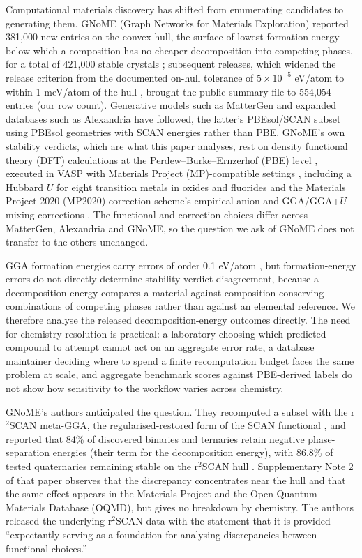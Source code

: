 \documentclass[11pt]{article}
\begin{document}
Computational materials discovery has shifted from enumerating candidates to generating
them. GNoME (Graph Networks for Materials Exploration) reported 381{,}000 new entries on the
convex hull, the surface of lowest formation energy below which a composition has no
cheaper decomposition into competing phases, for a total of 421{,}000
stable crystals \citep{merchant2023}; subsequent releases, which widened the
release criterion from the documented on-hull tolerance of $5\times10^{-5}$ eV/atom to
within 1 meV/atom of the hull \citep{gnomedataset}, brought the public summary file to
554{,}054 entries (our row count). Generative models such as MatterGen
\citep{zeni2025} and expanded databases such as Alexandria have followed, the latter's
PBEsol/SCAN subset \citep{schmidt2022} using PBEsol geometries with SCAN energies
rather than PBE. GNoME's own stability verdicts, which are
what this paper analyses, rest on density functional theory (DFT) calculations at the
Perdew--Burke--Ernzerhof (PBE) level \citep{pbe1996}, executed in VASP \citep{vasp1996}
with Materials Project (MP)-compatible settings \citep{jain2013}, including a Hubbard $U$
for eight transition metals in oxides and fluorides and the Materials Project 2020 (MP2020) correction scheme's empirical anion and
GGA/GGA+$U$ mixing corrections \citep{wang2021mp2020}. The functional and
correction choices differ across MatterGen, Alexandria and GNoME, so the question we ask
of GNoME does not transfer to the others unchanged.

GGA formation energies carry errors of order 0.1 eV/atom \citep{kirklin2015}, but
formation-energy errors do not directly determine stability-verdict disagreement,
because a decomposition energy compares a material against composition-conserving
combinations of competing phases rather than against an elemental reference. We
therefore analyse the released decomposition-energy outcomes directly. The need for
chemistry resolution is practical: a laboratory choosing which predicted compound to attempt cannot act on
an aggregate error rate, a database maintainer deciding where to spend a finite
recomputation budget faces the same problem at scale, and aggregate benchmark scores
against PBE-derived labels \citep{riebesell2025} do not show how sensitivity to the
workflow varies across chemistry.

GNoME's authors anticipated the question. They recomputed a subset with the r$^2$SCAN
meta-GGA, the regularised-restored form of the SCAN functional \citep{furness2020}, and reported that 84\% of discovered binaries and ternaries
retain negative phase-separation energies (their term for the decomposition energy), with
86.8\% of tested quaternaries remaining
stable on the r$^2$SCAN hull \citep{merchant2023}. Supplementary Note 2 of that paper observes that the
discrepancy concentrates near the hull and that the same effect appears in the Materials
Project and the Open Quantum Materials Database (OQMD), but gives no breakdown by chemistry. The authors released the underlying
r$^2$SCAN data with the statement that it is provided ``expectantly serving as a foundation
for analysing discrepancies between functional choices.''
\end{document}

